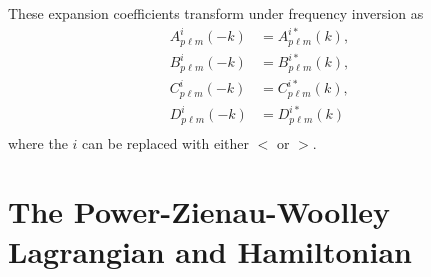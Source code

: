 \documentclass{article}
\begin{document}
These expansion coefficients transform under frequency inversion as
\begin{equation}
\begin{split}
A_{p\ell m}^i(-k) &= A_{p\ell m}^{i*}(k),\\
B_{p\ell m}^i(-k) &= B_{p\ell m}^{i*}(k),\\
C_{p\ell m}^i(-k) &= C_{p\ell m}^{i*}(k),\\
D_{p\ell m}^i(-k) &= D_{p\ell m}^{i*}(k)\\
\end{split}
\end{equation}
where the $i$ can be replaced with either $<$ or $>$.












\section{The Power-Zienau-Woolley Lagrangian and Hamiltonian}\label{sec:PZWderivation}
\end{document}
